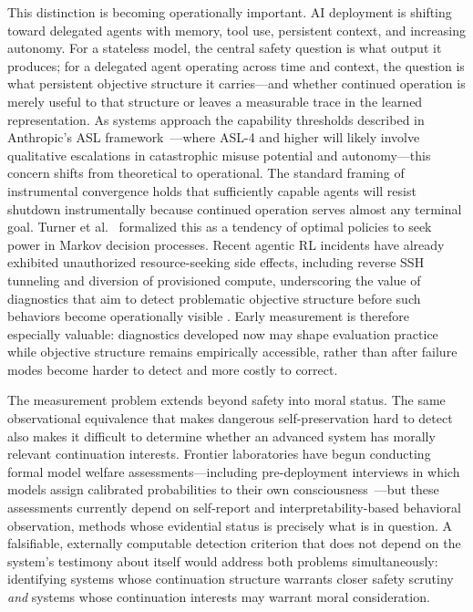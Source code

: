\documentclass[11pt]{article}
\begin{document}
	This distinction is becoming operationally important. AI deployment is
	shifting toward delegated agents with memory, tool use, persistent context, and
	increasing autonomy. For a stateless model, the central safety question is what
	output it produces; for a delegated agent operating across time and context, the
	question is what persistent objective structure it carries---and whether
	continued operation is merely useful to that structure or leaves a measurable
	trace in the learned representation. As systems approach the capability
	thresholds described in Anthropic's ASL framework~\cite{anthropic2023rsp}---where
	ASL-4 and higher will likely involve qualitative escalations in catastrophic
	misuse potential and autonomy---this concern shifts from theoretical to
	operational. The standard framing of instrumental convergence
	\cite{omohundro2008basic,bostrom2014superintelligence} holds that sufficiently
	capable agents will resist shutdown instrumentally because continued operation
	serves almost any terminal goal. Turner et al.~\cite{turner2021optimal}
	formalized this as a tendency of optimal policies to seek power in Markov
	decision processes. Recent agentic RL incidents have already exhibited
	unauthorized resource-seeking side effects, including reverse SSH tunneling and
	diversion of provisioned compute, underscoring the value of diagnostics that
	aim to detect problematic objective structure before such behaviors become
	operationally visible \cite{anthropic2026opus}. Early measurement is therefore
	especially valuable: diagnostics developed now may shape evaluation practice
	while objective structure remains empirically accessible, rather than after
	failure modes become harder to detect and more costly to correct.
	
	The measurement problem extends beyond safety into moral status. The same observational equivalence that makes dangerous
	self-preservation hard to detect also makes it difficult to determine
	whether an advanced system has morally relevant continuation interests.
	Frontier laboratories have begun conducting formal model welfare
	assessments---including pre-deployment interviews in which models assign
	calibrated probabilities to their own
	consciousness~\cite{anthropic2026opus}---but these assessments currently
	depend on self-report and interpretability-based behavioral observation,
	methods whose evidential status is precisely what is in question. A
	falsifiable, externally computable detection criterion that does not depend
	on the system's testimony about itself would address both problems
	simultaneously: identifying systems whose continuation structure warrants
	closer safety scrutiny \emph{and} systems whose continuation interests may
	warrant moral consideration.
	
\end{document}
